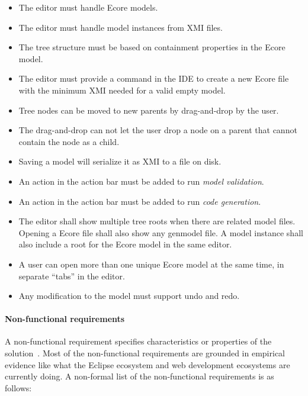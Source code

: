 \begin{itemize}
  \item The editor must handle \gls{Ecore} models.
  \item The editor must handle model instances from \acrshort{XMI} files.
  \item The tree structure must be based on containment properties in the \gls{Ecore} model.
  \item The editor must provide a command in the \acrshort{IDE} to create a new \gls{Ecore} file with the minimum \acrshort{XMI} needed for a valid empty model.
  \item Tree nodes can be moved to new parents by drag-and-drop by the user.
  \item The drag-and-drop can not let the user drop a node on a parent that cannot contain the node as a child. 
  \item Saving a model will serialize it as \acrshort{XMI} to a file on disk.
  \item An action in the action bar must be added to run \textit{model validation}.
  \item An action in the action bar must be added to run \textit{code generation}.
  \item The editor shall show multiple tree roots when there are related model files. Opening a \gls{Ecore} file shall also show any genmodel file. A model instance shall also include a root for the \gls{Ecore} model in the same editor.
  \item A user can open more than one unique \gls{Ecore} model at the same time, in separate ``tabs'' in the editor.
  \item Any modification to the model must support undo and redo.
\end{itemize}


\paragraph{Non-functional requirements}
A non-functional requirement specifies characteristics or properties of the solution~\cite[p.~7]{wiegersSoftwareRequirements2013}.
Most of the non-functional requirements are grounded in empirical evidence like what the Eclipse ecosystem and web development ecosystems are currently doing.
A non-formal list of the non-functional requirements is as follows:

